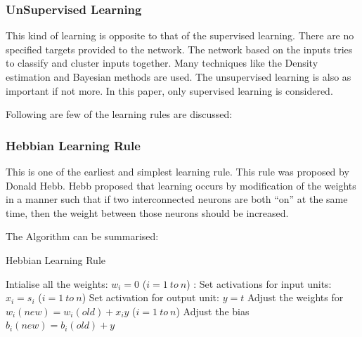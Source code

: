 \documentclass[a4paper,12pt]{report}
\begin{document}
\subsubsection*{UnSupervised Learning}
This kind of learning is opposite to that of the supervised learning. There are no specified targets provided to the network. The network based on the inputs
tries to classify and cluster inputs together. Many techniques like the Density estimation and Bayesian methods are used. The unsupervised learning is also as important if not more.
In this paper, only supervised learning is considered.

Following are few of the learning rules are discussed: 
\subsubsection*{Hebbian Learning Rule}
This is one of the earliest and simplest learning rule. This rule was proposed by Donald Hebb. Hebb proposed that learning occurs by modification of the weights
in a manner such that if two interconnected neurons are both ``on'' at the same time, then the weight between those neurons should be increased.

The Algorithm can be summarised\cite{bookann}:
\begin{algorithm}[h!]
\caption{Hebbian Learning Rule}
\label{Hebbian Learning Rule}
\begin{algorithmic}
 \State Intialise all the weights:
      \State\hspace{\algorithmicindent} $w_i = 0$ 	($i = 1\ to\ n$)
 :
      \State Set activations for input units:
	    \State\hspace{\algorithmicindent} $x_i = s_i$	($i = 1\ to\  n$)
      \State Set activation for output unit:
	    \State\hspace{\algorithmicindent} $y = t$	
      \State Adjust the weights for
	    \State\hspace{\algorithmicindent} $w_i(new) = w_i(old) + x_iy$ 	($i = 1\ to\ n$)
      \State Adjust the bias
	    \State\hspace{\algorithmicindent} $b_i(new) = b_i(old) + y$ 
  \EndFor
\end{algorithmic}
\end{algorithm}
\end{document}

